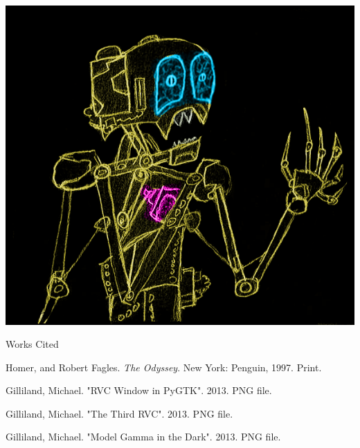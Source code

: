 \documentclass[12pt]{article}
\newcommand{\bibent}{\noindent \hangindent 40pt}
\newenvironment{workscited}{\newpage \begin{center} Works Cited \end{center}}{\newpage }
\begin{document}
\begin{flushleft}
\noindent  \includegraphics[scale=0.75]{Drone_InDark.png} \\


\begin{workscited}

\bibent
Homer, and Robert Fagles. \textit{The Odyssey}. New York: Penguin, 1997. Print.

\bibent
Gilliland, Michael. "RVC Window in PyGTK". 2013. PNG file.

\bibent
Gilliland, Michael. "The Third RVC". 2013. PNG file.

\bibent
Gilliland, Michael. "Model Gamma in the Dark". 2013. PNG file.

\end{workscited}

\end{flushleft}
\end{document}
